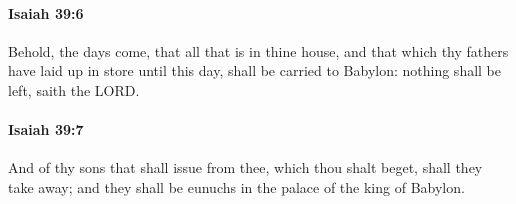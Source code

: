 		\paragraph{Isaiah 39:6} %
			\label{ISAIAH-39-6}

			Behold, the days come, that all that is in thine house, and that which thy fathers have laid up in store until this day, shall be carried to Babylon: nothing shall be left, saith the LORD.


		\paragraph{Isaiah 39:7} %
			\label{ISAIAH-39-7}

			And of thy sons that shall issue from thee, which thou shalt beget, shall they take away; and they shall be eunuchs in the palace of the king of Babylon.



